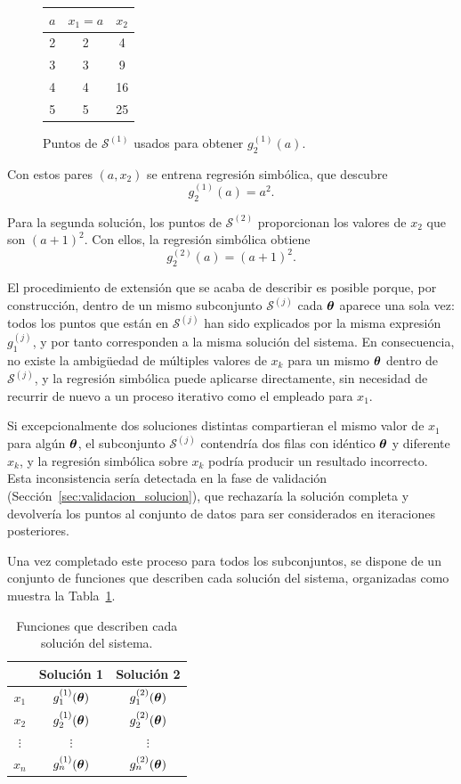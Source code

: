 \begin{figure}[H]
\centering
\begin{tabular}{c|c|c}
\(a\) & \(x_1 = a\) & \(x_2\) \\
\hline 2 & 2 & 4 \\
3 & 3 & 9 \\
4 & 4 & 16 \\
5 & 5 & 25
\end{tabular}
\caption{Puntos de \(\mathcal{S}^{(1)}\) usados para obtener
\(g_2^{(1)}(a)\).}
\label{fig:extension_tabla}
\end{figure}

Con estos pares \((a, x_2)\) se entrena regresión simbólica, que descubre
\[
g_2^{(1)}(a) = a^2 .
\]

Para la segunda solución, los puntos de \(\mathcal{S}^{(2)}\) proporcionan los valores de \(x_2\) que son \((a+1)^2\). Con ellos, la regresión simbólica obtiene
\[
g_2^{(2)}(a) = (a+1)^2 .
\]

El procedimiento de extensión que se acaba de describir es posible porque, por construcción, dentro de un mismo subconjunto
\(\mathcal{S}^{(j)}\) cada \(\boldsymbol{\theta}\) aparece una sola vez: todos
los puntos que están en \(\mathcal{S}^{(j)}\) han sido explicados por la misma expresión \(g_1^{(j)}\), y por tanto corresponden a la misma solución del sistema. En consecuencia, no existe la ambigüedad de múltiples valores de \(x_k\) para un mismo \(\boldsymbol{\theta}\) dentro de
\(\mathcal{S}^{(j)}\), y la regresión simbólica puede aplicarse
directamente, sin necesidad de recurrir de nuevo a un proceso iterativo como el empleado para \(x_1\).

Si excepcionalmente dos soluciones distintas compartieran el mismo valor de \(x_1\) para algún \(\boldsymbol{\theta}\), el subconjunto
\(\mathcal{S}^{(j)}\) contendría dos filas con idéntico \(\boldsymbol{\theta}\)
y diferente \(x_k\), y la regresión simbólica sobre \(x_k\) podría producir un resultado incorrecto. Esta inconsistencia sería detectada en la fase de validación (Sección~\ref{sec:validacion_solucion}), que rechazaría la solución completa y devolvería los puntos al conjunto de datos para ser considerados en iteraciones posteriores.

Una vez completado este proceso para todos los subconjuntos, se dispone de un conjunto de funciones que describen cada solución del sistema, organizadas como muestra la Tabla~\ref{tab:tabla_funciones_solucion}.

\begin{table}[H]
\centering \caption{Funciones que describen cada solución del sistema.} \label{tab:tabla_funciones_solucion}
\begin{tabular}{c|cc}
 & Solución 1 & Solución 2 \\
\hline
\(x_1\) & \(g_1^{(1)}(\boldsymbol{\theta})\) & \(g_1^{(2)}(\boldsymbol{\theta})\) \\
\(x_2\) & \(g_2^{(1)}(\boldsymbol{\theta})\) & \(g_2^{(2)}(\boldsymbol{\theta})\) \\
\(\vdots\) & \(\vdots\) & \(\vdots\) \\
\(x_n\) & \(g_n^{(1)}(\boldsymbol{\theta})\) & \(g_n^{(2)}(\boldsymbol{\theta})\)
\end{tabular}
\end{table}

